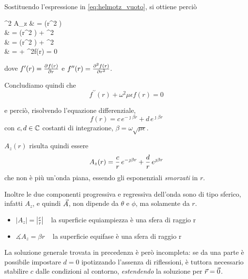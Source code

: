 Sostituendo l'espressione in \autoref{eq:helmotz_vuoto}, si ottiene perciò
\begin{esp*}
	\nabla^2 A_z
	& =  \left(r^2 \right) \\
	& =  \left(r^2 \right) + \omega^2 \mu\epsilon{} \\
	& =  \left(r^2 \right) + \omega^2 \mu\epsilon{}\\
	& =  
	+ \omega^2\mu\epsilon f(r) = 0\\
\end{esp*}
dove $f^\prime(r) = \deriv{f(r)}{r}$ e $f^{\prime\prime}(r) =\deriv[2]{f(r)}{r}$.

\smallbreak
Concludiamo quindi che
\begin{equation*}
	f^{\prime\prime}(r) + \omega^2\mu\epsilon f(r) = 0
\end{equation*}

e perciò, risolvendo l'equazione differenziale,
\begin{equation}
	f(r) = c \, e^{-\jmath \beta r} + d \, e^{\jmath \beta r}
\end{equation}
con $c,d \in \C$ costanti di integrazione, $\beta = \omega\sqrt{\mu\epsilon}$.

$A_z(r)$ risulta quindi essere
\begin{equation}
	A_z(r) = \frac{c}{r}\, \ejbr +\frac{d}{r}\, \ejbrp
\end{equation}
che non è più un'onda piana, essendo gli esponenziali \emph{smorzati} in $r$.

Inoltre le due componenti progressiva e regressiva dell'onda sono di tipo sferico, infatti $A_z$, e quindi $\A$, non dipende da $\theta$ e $\phi$, ma solamente da $r$.
\begin{itemize}
	\item $|A_z| = \left|\frac{c}{r}\right|$
	~ la superficie equiampiezza è una sfera di raggio r
	\item $\measuredangle A_z = \beta r$
	~ la superficie equifase è una sfera di raggio r
\end{itemize}

\smallbreak
La soluzione generale trovata in precedenza è però incompleta: se da una parte è possibile impostare $d = 0$ ipotizzando l'assenza di riflessioni, è tuttora necessario stabilire $c$ dalle condizioni al contorno, \emph{estendendo} la soluzione per $\r = \vec{0}$.

